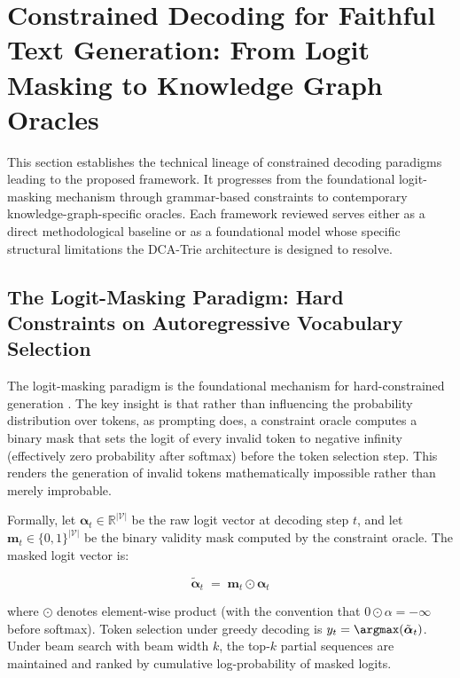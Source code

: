 \section{Constrained Decoding for Faithful Text Generation: From Logit Masking
  to Knowledge Graph Oracles}
\label{sec:constrained}

This section establishes the technical lineage of constrained decoding paradigms leading to the proposed framework. It progresses from the foundational logit-masking mechanism through grammar-based constraints to contemporary knowledge-graph-specific oracles. Each framework reviewed serves either as a direct methodological baseline or as a foundational model whose specific structural limitations the DCA-Trie architecture is designed to resolve.

\subsection{The Logit-Masking Paradigm: Hard Constraints on Autoregressive
    Vocabulary Selection}

The logit-masking paradigm is the foundational mechanism for hard-constrained
generation \citep{geng2023gcd, willard2023outlines}. The key insight is that
rather than influencing the probability distribution over tokens, as prompting
does, a constraint oracle computes a binary mask that sets the logit of every
invalid token to negative infinity (effectively zero probability after softmax)
before the token selection step. This renders the generation of invalid tokens
mathematically impossible rather than merely improbable.

Formally, let $\boldsymbol{\alpha}_t \in \mathbb{R}^{|\mathcal{V}|}$ be the raw
logit vector at decoding step $t$, and let $\mathbf{m}_t \in \{0, 1\}^{|\mathcal{V}|}$
be the binary validity mask computed by the constraint oracle. The masked logit
vector is:

\begin{equation}
    \tilde{\boldsymbol{\alpha}}_t \;=\; \mathbf{m}_t \odot \boldsymbol{\alpha}_t
    \label{eq:logitmask}
\end{equation}

where $\odot$ denotes element-wise product (with the convention that
$0 \odot \alpha = -\infty$ before softmax). Token selection under greedy
decoding is $y_t = \argmax(\tilde{\boldsymbol{\alpha}}_t)$. Under beam search
with beam width $k$, the top-$k$ partial sequences are maintained and ranked by
cumulative log-probability of masked logits.

